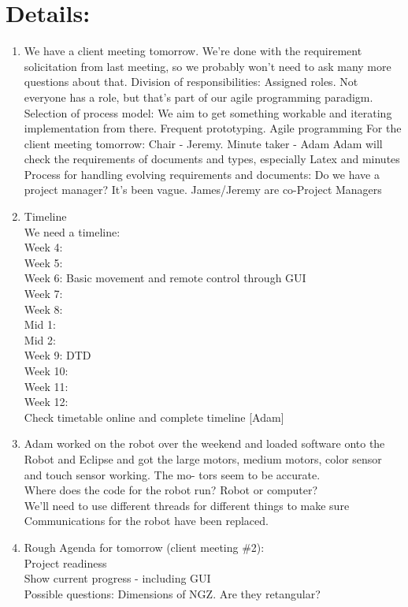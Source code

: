 \documentclass{article}
\begin{document}
\section{Details:}
\begin{enumerate}
\item We have a client meeting tomorrow. We're done with the requirement solicitation from last
meeting, so we probably won't need to ask many more questions about that.
Division of responsibilities: Assigned roles. Not everyone has a role, but that's part of our
agile programming paradigm. Selection of process model: We aim to get something workable
and iterating implementation from there. Frequent prototyping. Agile programming
For the client meeting tomorrow: Chair - Jeremy. Minute taker - Adam
Adam will check the requirements of documents and types, especially Latex and minutes
Process for handling evolving requirements and documents:
Do we have a project manager? It's been vague. James/Jeremy are co-Project Managers
\item Timeline\\
We need a timeline:\\
Week 4:\\
Week 5:\\
Week 6: Basic movement and remote control through GUI\\
Week 7:\\
Week 8:\\
Mid 1:\\
Mid 2:\\
Week 9: DTD\\
Week 10:\\
Week 11:\\
Week 12:\\
Check timetable online and complete timeline [Adam]\\
\item Adam worked on the robot over the weekend and loaded software onto the Robot and Eclipse
and got the large motors, medium motors, color sensor and touch sensor working. The mo-
tors seem to be accurate.\\
Where does the code for the robot run? Robot or computer?\\
We'll need to use different threads for different things to make sure\\
Communications for the robot have been replaced.\\
\item Rough Agenda for tomorrow (client meeting \#2):\\
Project readiness\\
Show current progress - including GUI\\
Possible questions: Dimensions of NGZ. Are they retangular?\\


\end{enumerate}
\end{document}
